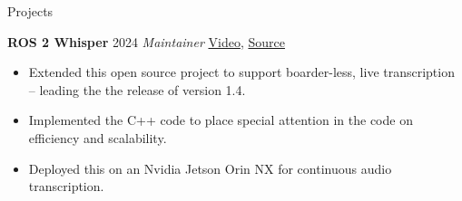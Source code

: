 \begin{rubric}{Projects}

\entry*[] \textbf{ROS 2 Whisper} \hfill 2024 \newline
\emph{Maintainer} \hfill  \href{https://github.com/ros-ai/ros2_whisper/blob/main/doc/harry_potter_sample.gif}{Video}, \href{https://github.com/ros-ai/ros2_whisper}{\faGithub Source} \newline
\vspace{\CVItemizeHeaderSpacing} \begin{itemize}[leftmargin=*, rightmargin=1cm]
	\setlength{\itemsep}{\CVItemizeSpacing}
	\item Extended this open source project to support boarder-less, live transcription -- leading the the release of version 1.4.
	\item Implemented the C++ code to place special attention in the code on efficiency and scalability.
	\item Deployed this on an Nvidia Jetson Orin NX for continuous audio transcription.
\end{itemize}


\end{rubric}
